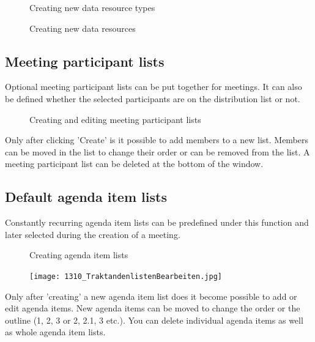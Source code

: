 \begin{figure}[H]
\caption{Creating new data resource types}
\end{figure}

\begin{figure}[H]
\caption{Creating new data resources}
\end{figure}


\subsection{Meeting participant lists}

Optional meeting participant lists can be put together for meetings. It can also be defined whether the selected participants are on the distribution list or not.

\begin{figure}[H]
\end{figure}

\begin{figure}[H]
\vspace{-25pt}
\caption{Creating and editing meeting participant lists}
\end{figure}

Only after clicking 'Create' is it possible to add members to a new list. Members can be moved in the list to change their order or can be removed from the list. A meeting participant list can be deleted at the bottom of the window.

\clearpage
\subsection{Default agenda item lists}

Constantly recurring agenda item lists can be predefined under this function and later selected during the creation of a meeting.

\begin{figure}[H]
\caption{Creating agenda item lists}
\end{figure}

\begin{figure}
\vspace{-15pt}
\texttt{[image: 1310\_TraktandenlistenBearbeiten.jpg]}
\end{figure}

Only after 'creating' a new agenda item list does it become possible to add or edit agenda items. New agenda items can be moved to change the order or the outline (1, 2, 3 or 2, 2.1, 3 etc.). You can delete individual agenda items as well as whole agenda item lists.
